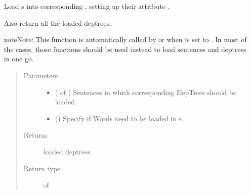 \documentclass[letterpaper,10pt,english]{sphinxmanual}
\begin{document}
\begin{fulllineitems}
\label{\detokenize{load:loacore.load.deptree_load.load_dep_tree_in_sentences}}
Load  s into corresponding , setting up their attribute .

Also return all the loaded deptrees.

\begin{sphinxadmonition}{note}{Note:}
This function is automatically called by  or
 when  is set to .
In most of the cases, those functions should be used instead to load sentences and deptrees in one go.
\end{sphinxadmonition}
\begin{quote}\begin{description}
\item[{Parameters}] \leavevmode\begin{itemize}
\item {} 
 ( of ) \textendash{} Sentences in which corresponding DepTrees should be loaded.

\item {} 
 () \textendash{} Specify if Words need to be loaded in  s.

\end{itemize}

\item[{Returns}] \leavevmode
loaded deptrees

\item[{Return type}] \leavevmode
{} of 

\end{description}\end{quote}

\end{fulllineitems}
\end{document}
